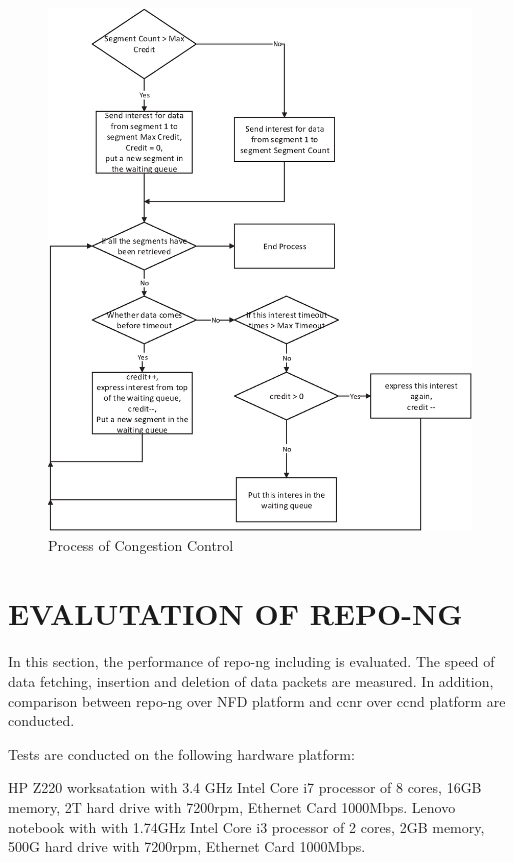 \documentclass{acm_proc_article-sp}
\begin{document}
\begin{figure}
\centering
\includegraphics{Drawing5.eps}
\caption{Process of Congestion Control}
\end{figure}

\section{EVALUTATION OF REPO-NG}

In this section, the performance of repo-ng including is evaluated. The speed of data fetching, insertion and deletion of data packets are measured. In addition, comparison between repo-ng over NFD platform and ccnr over ccnd platform are conducted.

Tests are conducted on the following hardware platform:

HP Z220 worksatation with 3.4 GHz Intel Core i7 processor of 8 cores, 16GB memory, 2T hard drive with 7200rpm, Ethernet Card 1000Mbps.
Lenovo notebook with with 1.74GHz Intel Core i3 processor of 2 cores, 2GB memory, 500G hard drive with 7200rpm, Ethernet Card 1000Mbps.
\end{document}
